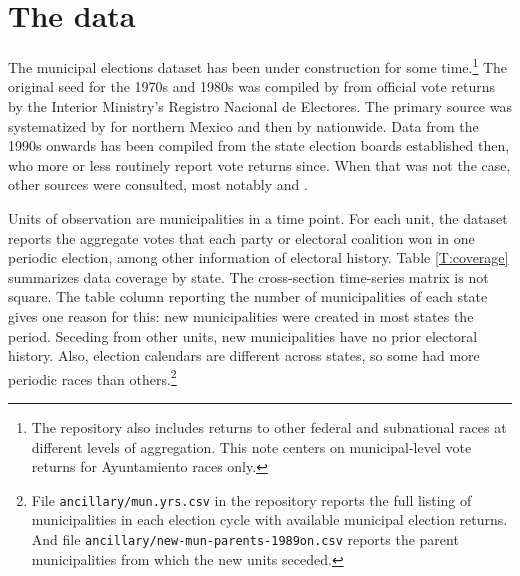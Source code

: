 \documentclass[letter,12pt]{article}
\begin{document}
\section{The data}

The municipal elections dataset has been under construction for some time.\footnote{The repository also includes returns to other federal and subnational races at different levels of aggregation. This note centers on municipal-level vote returns for Ayuntamiento races only.} The original seed for the 1970s and 1980s was compiled by \citet{molinar.1991a} from official vote returns by the Interior Ministry's Registro Nacional de Electores. The primary source was systematized by \citet{magar.1994} for northern Mexico and then by \citet{varela.2004} nationwide. Data from the 1990s onwards has been compiled from the state election boards established then, who more or less routinely report vote returns since. When that was not the case, other sources were consulted, most notably \citet{revista.voz.y.voto} and \citet{cede.uam.izt}.

Units of observation are municipalities in a time point. For each unit, the dataset reports the aggregate votes that each party or electoral coalition won in one periodic election, among other information of electoral history. Table \ref{T:coverage} summarizes data coverage by state. The cross-section time-series matrix is not square. The table column reporting the number of municipalities of each state gives one reason for this: new municipalities were created in most states the period. Seceding from other units, new municipalities have no prior electoral history. Also, election calendars are different across states, so some had more periodic races than others.\footnote{File \verb|ancillary/mun.yrs.csv| in the repository reports the full listing of municipalities in each election cycle with available municipal election returns. And file \verb|ancillary/new-mun-parents-1989on.csv| reports the parent municipalities from which the new units seceded.}
\end{document}
